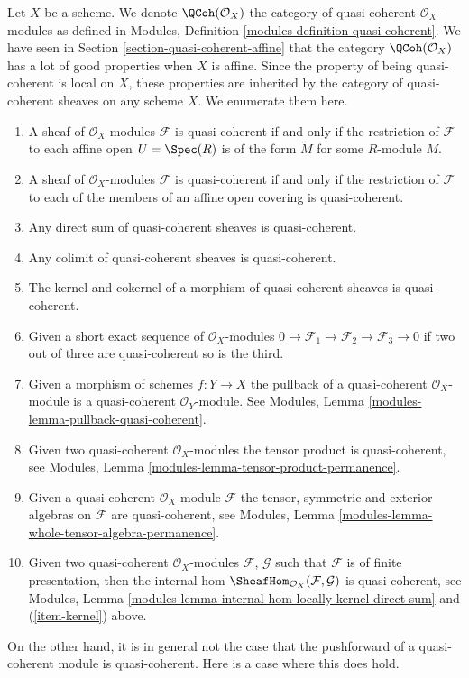 \noindent
Let $X$ be a scheme. We denote $\QCoh(\mathcal{O}_X)$ the
category of quasi-coherent $\mathcal{O}_X$-modules as defined in
Modules, Definition \ref{modules-definition-quasi-coherent}.
We have seen in
Section \ref{section-quasi-coherent-affine}
that the category $\QCoh(\mathcal{O}_X)$ has a lot of good properties
when $X$ is affine. Since the property of being quasi-coherent is
local on $X$, these properties are inherited by the category
of quasi-coherent sheaves on any scheme $X$. We enumerate them here.
\begin{enumerate}
\item A sheaf of $\mathcal{O}_X$-modules $\mathcal{F}$ is
quasi-coherent if and only if the restriction of $\mathcal{F}$
to each affine open $U = \Spec(R)$ is of the form
$\widetilde M$ for some $R$-module $M$.
\item A sheaf of $\mathcal{O}_X$-modules $\mathcal{F}$ is
quasi-coherent if and only if the restriction of $\mathcal{F}$
to each of the members of an affine open covering is quasi-coherent.
\item Any direct sum of quasi-coherent sheaves is quasi-coherent.
\item Any colimit of quasi-coherent sheaves is quasi-coherent.
\item
\label{item-kernel}
The kernel and cokernel of a morphism of quasi-coherent sheaves
is quasi-coherent.
\item Given a short exact sequence of $\mathcal{O}_X$-modules
$0 \to \mathcal{F}_1 \to \mathcal{F}_2 \to \mathcal{F}_3 \to 0$
if two out of three are quasi-coherent so is the third.
\item Given a morphism of schemes $f : Y \to X$ the pullback
of a quasi-coherent $\mathcal{O}_X$-module is a quasi-coherent
$\mathcal{O}_Y$-module. See
Modules, Lemma \ref{modules-lemma-pullback-quasi-coherent}.
\item Given two quasi-coherent $\mathcal{O}_X$-modules
the tensor product is quasi-coherent, see
Modules, Lemma \ref{modules-lemma-tensor-product-permanence}.
\item Given a quasi-coherent $\mathcal{O}_X$-module $\mathcal{F}$
the tensor, symmetric and exterior algebras on $\mathcal{F}$
are quasi-coherent, see
Modules, Lemma \ref{modules-lemma-whole-tensor-algebra-permanence}.
\item Given two quasi-coherent $\mathcal{O}_X$-modules
$\mathcal{F}$, $\mathcal{G}$ such that $\mathcal{F}$
is of finite presentation, then the internal hom
$\SheafHom_{\mathcal{O}_X}(\mathcal{F}, \mathcal{G})$
is quasi-coherent, see
Modules, Lemma \ref{modules-lemma-internal-hom-locally-kernel-direct-sum}
and (\ref{item-kernel}) above.
\end{enumerate}
On the other hand, it is in general not the case that the
pushforward of a quasi-coherent module is quasi-coherent.
Here is a case where this does hold.

